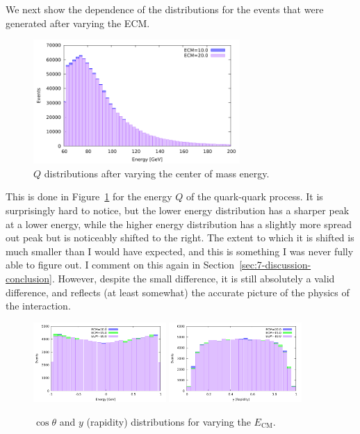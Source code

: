 We next show the dependence of the distributions for the events that were generated after varying the ECM. 

\begin{figure}[ht]
  \centering
  \includegraphics[width=0.7\textwidth]{./res/gfx/Q2.pdf}
  \caption{$Q$ distributions after varying the center of mass energy.}
  \label{fig:q-dist}
\end{figure}

This is done in Figure~\ref{fig:q-dist} for the energy $Q$ of the quark-quark process. It is surprisingly hard to notice, but the lower energy distribution has a sharper peak at a lower energy, while the higher energy distribution has a slightly more spread out peak but is noticeably shifted to the right. The extent to which it is shifted is much smaller than I would have expected, and this is something I was never fully able to figure out. I comment on this again in Section~\ref{sec:7-discussion-conclusion}. However, despite the small difference, it is still absolutely a valid difference, and reflects (at least somewhat) the accurate picture of the physics of the interaction.


\begin{figure}[ht]
  \centering
  \includegraphics[width=0.45\textwidth]{./res/gfx/cos_theta.pdf}
  \includegraphics[width=0.45\textwidth]{./res/gfx/y.pdf}
  \caption{$\cos\theta$ and $y$ (rapidity) distributions for varying the $E_{\mathrm{CM}}$.}
  \label{fig:cos-theta-y-dist}
\end{figure}

